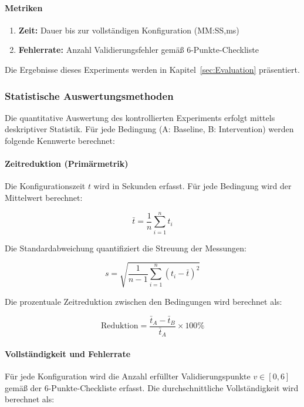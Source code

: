 \paragraph{Metriken}
\begin{enumerate}
    \item \textbf{Zeit:} Dauer bis zur vollständigen Konfiguration (MM:SS,ms)
    \item \textbf{Fehlerrate:} Anzahl Validierungsfehler gemäß 6-Punkte-Checkliste
\end{enumerate}

Die Ergebnisse dieses Experiments werden in Kapitel~\ref{sec:Evaluation} präsentiert.

\subsubsection{Statistische Auswertungsmethoden}
\label{subsubsec:StatistischeAuswertung}

Die quantitative Auswertung des kontrollierten Experiments erfolgt mittels deskriptiver Statistik. Für jede Bedingung (A: Baseline, B: Intervention) werden folgende Kennwerte berechnet:

\paragraph{Zeitreduktion (Primärmetrik)}

Die Konfigurationszeit $t$ wird in Sekunden erfasst. Für jede Bedingung wird der Mittelwert berechnet:

\[
\bar{t} = \frac{1}{n} \sum_{i=1}^{n} t_i
\]

Die Standardabweichung quantifiziert die Streuung der Messungen:

\[
s = \sqrt{\frac{1}{n-1} \sum_{i=1}^{n} (t_i - \bar{t})^2}
\]

Die prozentuale Zeitreduktion zwischen den Bedingungen wird berechnet als:

\[
\text{Reduktion} = \frac{\bar{t}_A - \bar{t}_B}{\bar{t}_A} \times 100\%
\]

\paragraph{Vollständigkeit und Fehlerrate}

Für jede Konfiguration wird die Anzahl erfüllter Validierungspunkte $v \in [0, 6]$ gemäß der 6-Punkte-Checkliste erfasst. Die durchschnittliche Vollständigkeit wird berechnet als:

